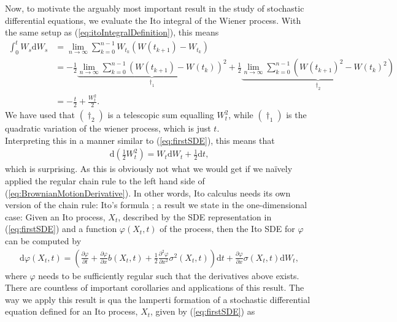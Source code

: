 Now, to motivate the arguably most important result in the study of stochastic differential equations, we evaluate the Ito integral of the Wiener process. With the same setup as (\ref{eq:itoIntegralDefinition}), this means
\begin{align}
    \int_0^t W_s \mathrm{d}W_s & = \lim_{n \to \infty}\sum_{k = 0}^{n-1} W_{t_k}\left(W(t_{k + 1}) - W_{t_k}\right) \nonumber \\ 
    & = - \frac{1}{2}\underbrace{\lim_{n \to \infty}\sum_{k = 0}^{n-1} \left(W(t_{k + 1}) - W(t_{k})\right)^2}_{\dagger_1}  + \frac{1}{2}\underbrace{\lim_{n \to \infty}\sum_{k = 0}^{n-1}\left(W(t_{k + 1})^2 - W(t_{k})^2\right)}_{\dagger_2} \nonumber \\
    & = -\frac{t}{2} + \frac{W_t^2}{2}.
\end{align}
We have used that $(\dagger_2)$ is a telescopic sum equalling $W_t^2$, while $(\dagger_1)$ is the quadratic variation of the wiener process, which is just $t$. \cite[theorem 11.34]{Hansen2022}\\ Interpreting this in a manner similar to (\ref{eq:firstSDE}), this means that
\begin{align}
    \mathrm{d}\left(\frac{1}{2}W_t^2\right) = W_t\mathrm{d}W_t + \frac{1}{2}\mathrm{d}t, \label{eq:BrownianMotionDerivative}
\end{align}
which is surprising. As this is obviously not what we would get if we naïvely applied the regular chain rule to the left hand side of (\ref{eq:BrownianMotionDerivative}). In other words, Ito calculus needs its own version of the chain rule: Ito's formula \cite[Theorem 4.2]{Srkk2019}; a result we state in the one-dimensional case:  Given an Ito process, $X_t$, described by the SDE representation in (\ref{eq:firstSDE}) and a function $\varphi(X_t, t)$ of the process, then the Ito SDE for $\varphi$ can be computed by
\begin{align}
    \mathrm{d}\varphi(X_t, t) = \left(\frac{\partial \varphi}{\partial t} + \frac{\partial\varphi}{\partial x}b(X_t, t) + \frac{1}{2} \frac{\partial^2 \varphi}{\partial x^2}\sigma^2(X_t, t) \right)\mathrm{d}t + \frac{\partial\varphi}{\partial x}\sigma(X_t, t) \mathrm{d}W_t,
\end{align}
where $\varphi$ needs to be sufficiently regular such that the derivatives above exists. 
There are countless of important corollaries and applications of this result. The way we apply this result is qua the lamperti formation of a stochastic differential equation defined for an Ito process, $X_t$, given by (\ref{eq:firstSDE}) as
